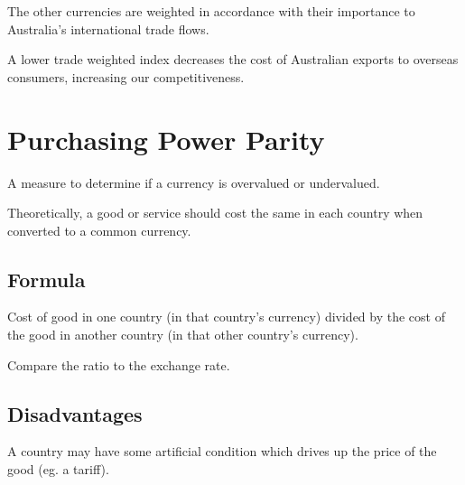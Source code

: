 \documentclass[a4paper,11pt]{article}
\begin{document}
The other currencies are weighted in accordance with their importance to
Australia's international trade flows.

A lower trade weighted index decreases the cost of Australian exports to
overseas consumers, increasing our competitiveness.




\section{Purchasing Power Parity}

A measure to determine if a currency is overvalued or undervalued.

Theoretically, a good or service should cost the same in each country when
converted to a common currency.


\subsection{Formula}

Cost of good in one country (in that country's currency) divided by the cost of
the good in another country (in that other country's currency).

Compare the ratio to the exchange rate.


\subsection{Disadvantages}

A country may have some artificial condition which drives up the price of the
good (eg. a tariff).
\end{document}
